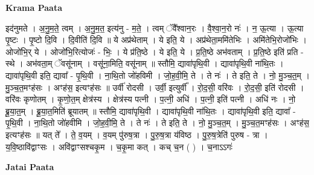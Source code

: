 \documentclass[17pt]{extarticle}
\begin{document}
\textbf{Krama Paata} \newline

इद॑नुमते । अ॒नु॒म॒ते॒ त्वम् । अ॒नु॒म॒त॒ इत्य॑नु - म॒ते॒ । त्वम् ॅवै᳚श्वान॒रः । वै॒श्वा॒न॒रो नः॑ । न॒ ऊ॒त्या । ऊ॒त्या पृ॒ष्टः । पृ॒ष्टो दि॒वि । दि॒वीति॑ दि॒वि ॥ ये अप्र॑थेताम् । ये इति॒ ये । अप्र॑थेता॒ममि॑तेभिः । अमि॑तेभि॒रोजो॑भिः । ओजो॑भि॒र् ये । ओजो॑भि॒रित्योजः॑ - भिः॒ । ये प्र॑ति॒ष्ठे । ये इति॒ ये । प्र॒ति॒ष्ठे अभ॑वताम् । प्र॒ति॒ष्ठे इति॑ प्रति - स्थे । अभ॑वता॒म् ॅवसू॑नाम् । वसू॑ना॒मिति॒ वसू॑नाम् ॥ स्तौमि॒ द्यावा॑पृथि॒वी । द्यावा॑पृथि॒वी ना॑थि॒तः । द्यावा॑पृथि॒वी इति॒ द्यावा᳚ - पृ॒थि॒वी । ना॒थि॒तो जो॑हविमी । जो॒ह॒वी॒मि॒ ते । ते नः॑ । ते इति॒ ते । नो॒ मु॒ञ्च॒त॒॒म् । मु॒ञ्च॒त॒मꣳह॑सः । अꣳह॑स॒ इत्यꣳह॑सः ॥ उर्वी॑ रोदसी । उर्वी॒ इत्युर्वी᳚ । रो॒द॒सी॒ वरि॑वः । रो॒द॒सी॒ इति॑ रोदसी । वरि॑वः कृणोतम् । कृ॒णो॒त॒म् क्षेत्र॑स्य । क्षेत्र॑स्य पत्नी । प॒त्नी॒ अधि॑ । प॒त्नी॒ इति॑ पत्नी । अधि॑ नः । नो॒ ब्रू॒या॒त॒॒म् । ब्रू॒या॒त॒मिति॑ ब्रूयातम् ॥ स्तौमि॒ द्यावा॑पृथि॒वी । द्यावा॑पृथि॒वी ना॑थि॒तः । द्यावा॑पृथि॒वी इति॒ द्यावा᳚ - पृ॒थि॒वी । ना॒थि॒तो जो॑हवीमि । जो॒ह॒वी॒मि॒ ते । ते नः॑ । ते इति॒ ते । नो॒ मु॒ञ्च॒त॒म् । मु॒ञ्च॒त॒मꣳह॑सः । अꣳह॑स॒ इत्यꣳह॑सः ॥ यत् ते᳚ । ते॒ व॒यम् । व॒यम् पु॑रुष॒त्रा । पु॒रु॒ष॒त्रा य॑विष्ठ । पु॒रु॒ष॒त्रेति॑ पुरुष - त्रा । य॒वि॒ष्ठावि॑द्वाꣳसः । अवि॑द्वाꣳसश्चकृ॒म । च॒कृ॒मा कत् । कच् च॒न ( ) । च॒नाऽऽगः॑ \newline

\textbf{Jatai Paata} \newline
\end{document}
